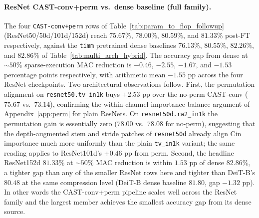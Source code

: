 \documentclass[11pt]{article}
\theoremstyle{plain}
\theoremstyle{definition}
\theoremstyle{remark}
\newcommand{\1}{\mathbf{1}}
\begin{document}
\paragraph{ResNet CAST-conv+perm vs.\ dense baseline (full family).}
The four \texttt{CAST-conv+perm} rows of Table~\ref{tab:param_to_flop_followup} (ResNet50/50d/101d/152d) reach \(75.67\%\), \(78.00\%\), \(80.59\%\), and \(81.33\%\) post-FT respectively, against the \texttt{timm} pretrained dense baselines \(76.13\%\), \(80.55\%\), \(82.26\%\), and \(82.86\%\) of Table~\ref{tab:multi_arch_hybrid}.  The accuracy gap from dense at \(\sim\!50\%\) sparse-execution MAC reduction is \(-0.46\), \(-2.55\), \(-1.67\), and \(-1.53\) percentage points respectively, with arithmetic mean \(-1.55\) pp across the four ResNet checkpoints.  Two architectural observations follow.  First, the permutation alignment on \texttt{resnet50.tv\_in1k} buys \(+2.53\) pp over the no-perm CAST-conv (\(75.67\) vs.\ \(73.14\)), confirming the within-channel importance-balance argument of Appendix~\ref{app:perm} for plain ResNets.  On \texttt{resnet50d.ra2\_in1k} the permutation gain is essentially zero (\(78.00\) vs.\ \(78.08\) for no-perm), suggesting that the depth-augmented stem and stride patches of \texttt{resnet50d} already align Cin importance much more uniformly than the plain \texttt{tv\_in1k} variant; the same reading applies to ResNet101d's \(+0.46\) pp from perm.  Second, the headline ResNet152d \(81.33\%\) at \(\sim\!50\%\) MAC reduction is within \(1.53\) pp of dense \(82.86\%\), a tighter gap than any of the smaller ResNet rows here and tighter than DeiT-B's \(80.48\) at the same compression level (DeiT-B dense baseline \(81.80\), gap \(-1.32\) pp).  In other words the CAST-conv+perm pipeline scales well across the ResNet family and the largest member achieves the smallest accuracy gap from its dense source.
\end{document}

